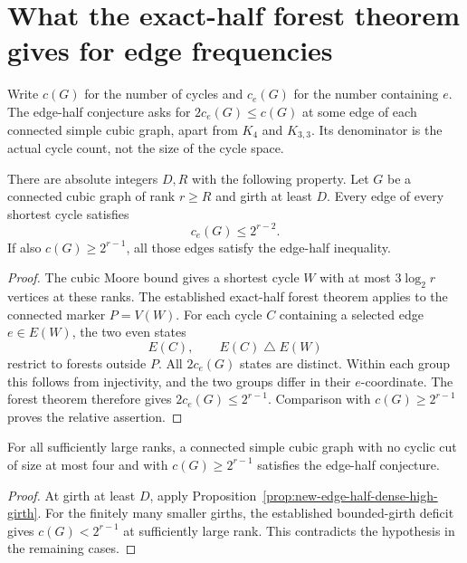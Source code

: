 \section{What the exact-half forest theorem gives for edge frequencies}
\label{sec:new-edge-half-reductions}

Write $c(G)$ for the number of cycles and $c_e(G)$ for the number containing $e$.
The edge-half conjecture asks for $2c_e(G)\le c(G)$ at some edge of each connected simple cubic graph, apart from $K_4$ and $K_{3,3}$.
Its denominator is the actual cycle count, not the size of the cycle space.

\begin{proposition}
\label{prop:new-edge-half-dense-high-girth}
There are absolute integers $D,R$ with the following property.
Let $G$ be a connected cubic graph of rank $r\ge R$ and girth at least $D$.
Every edge of every shortest cycle satisfies
\[
 c_e(G)\le2^{r-2}.
\]
If also $c(G)\ge2^{r-1}$, all those edges satisfy the edge-half inequality.
\end{proposition}

\begin{proof}
The cubic Moore bound gives a shortest cycle $W$ with at most $3\log_2r$ vertices at these ranks.
The established exact-half forest theorem applies to the connected marker $P=V(W)$.
For each cycle $C$ containing a selected edge $e\in E(W)$, the two even states
\[
 E(C),\qquad E(C)\mathbin\triangle E(W)
\]
restrict to forests outside $P$.
All $2c_e(G)$ states are distinct.
Within each group this follows from injectivity, and the two groups differ in their $e$-coordinate.
The forest theorem therefore gives $2c_e(G)\le2^{r-1}$.
Comparison with $c(G)\ge2^{r-1}$ proves the relative assertion.
\end{proof}

\begin{corollary}
\label{cor:new-edge-half-below-density}
For all sufficiently large ranks, a connected simple cubic graph with no cyclic cut of size at most four and with $c(G)\ge2^{r-1}$ satisfies the edge-half conjecture.
\end{corollary}

\begin{proof}
At girth at least $D$, apply Proposition~\ref{prop:new-edge-half-dense-high-girth}.
For the finitely many smaller girths, the established bounded-girth deficit gives $c(G)<2^{r-1}$ at sufficiently large rank.
This contradicts the hypothesis in the remaining cases.
\end{proof}

